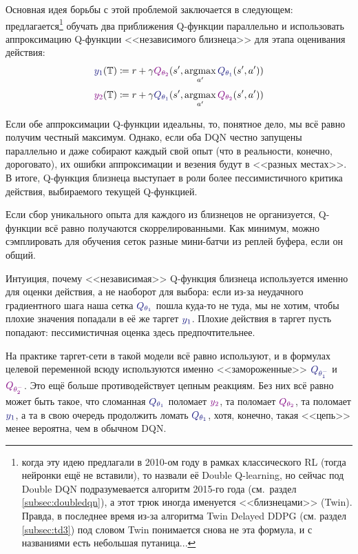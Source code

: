 Основная идея борьбы с этой проблемой заключается в следующем: предлагается\footnote{когда эту идею предлагали в 2010-ом году в рамках классического RL (тогда нейронки ещё не вставили), то назвали её Double Q-learning, но сейчас под Double DQN подразумевается алгоритм 2015-го года (см.~раздел \ref{subsec:doubledqn}), а этот трюк иногда именуется <<близнецами>> (Twin). Правда, в последнее время из-за алгоритма Twin Delayed DDPG (см. раздел \ref{subsec:td3}) под словом Twin понимается снова не эта формула, и с названиями есть небольшая путаница...} обучать два приближения Q-функции параллельно и использовать аппроксимацию Q-функции <<независимого близнеца>> для этапа оценивания действия:
$$\textcolor{ChadBlue}{y_1}(\T ) \coloneqq r + \gamma \textcolor{ChadPurple}{Q_{\theta_2}}(s', \argmax\limits_{a'} \textcolor{ChadBlue}{Q_{\theta_1}}(s', a'))$$
$$\textcolor{ChadPurple}{y_2}(\T ) \coloneqq r + \gamma \textcolor{ChadBlue}{Q_{\theta_1}}(s', \argmax\limits_{a'} \textcolor{ChadPurple}{Q_{\theta_2}}(s', a'))$$

Если обе аппроксимации Q-функции идеальны, то, понятное дело, мы всё равно получим честный максимум. Однако, если оба DQN честно запущены параллельно и даже собирают каждый свой опыт (что в реальности, конечно, дороговато), их ошибки аппроксимации и везения будут в <<разных местах>>. В итоге, Q-функция близнеца выступает в роли более пессимистичного критика действия, выбираемого текущей Q-функцией. 

\begin{remark}
Если сбор уникального опыта для каждого из близнецов не организуется, Q-функции всё равно получаются скоррелированными. Как минимум, можно сэмплировать для обучения сеток разные мини-батчи из реплей буфера, если он общий.
\end{remark}

Интуиция, почему <<независимая>> Q-функция близнеца используется именно для оценки действия, а не наоборот для выбора: если из-за неудачного градиентного шага наша сетка $ \textcolor{ChadBlue}{Q_{\theta_1}}$ пошла куда-то не туда, мы не хотим, чтобы плохие значения попадали в её же таргет $\textcolor{ChadBlue}{y_1}$. Плохие действия в таргет пусть попадают: пессимистичная оценка здесь предпочтительнее.

\begin{remark}
На практике таргет-сети в такой модели всё равно используют, и в формулах целевой переменной всюду используются именно <<замороженные>> $\textcolor{ChadBlue}{Q_{\theta^-_1}}$ и $\textcolor{ChadPurple}{Q_{\theta^-_2}}$. Это ещё больше противодействует цепным реакциям. Без них всё равно может быть такое, что сломанная $\textcolor{ChadBlue}{Q_{\theta_1}}$ поломает $\textcolor{ChadPurple}{y_2}$, та поломает $\textcolor{ChadPurple}{Q_{\theta_2}}$, та поломает $\textcolor{ChadBlue}{y_1}$, а та в свою очередь продолжить ломать $\textcolor{ChadBlue}{Q_{\theta_1}}$, хотя, конечно, такая <<цепь>> менее вероятна, чем в обычном DQN.
\end{remark}

